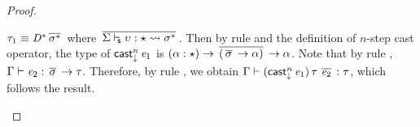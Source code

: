 \begin{proof}
\begin{description}
$\tau_{{\mathrm{1}}}  \equiv  \mathit{D}  ^{*} \,\overline{  \sigma  ^{*}  }\,$ where $\,\overline{   \Sigma  \vdash_{\!\!\mathsf{s} }  \upsilon  :  \star   \rightsquigarrow   \sigma  ^{*}   }\,$. Then by
rule  and the definition of $n$-step cast operator, the
type of $\mathsf{cast}_{\downarrow}^n \, \mathit{e_{{\mathrm{1}}}}$ is $(  \alpha  :  \star  )  \rightarrow  \,\overline{  (  \,\overline{  \sigma  }\,  \rightarrow  \alpha  )  }\,  \rightarrow  \alpha$. Note
that by rule , $\Gamma  \vdash  \mathit{e_{{\mathrm{2}}}}  :  \,\overline{  \sigma  }\,  \rightarrow  \tau$. Therefore, by rule
, we obtain $\Gamma  \vdash  (  \mathsf{cast}_{\downarrow}^n \, \mathit{e_{{\mathrm{1}}}}  ) \, \tau \, \,\overline{  \mathit{e_{{\mathrm{2}}}}  }\,  :  \tau$, which follows
the result.
    \end{description}
\end{proof}


